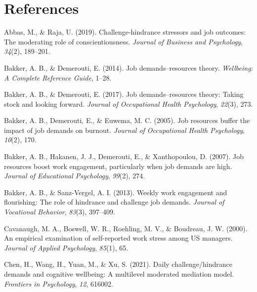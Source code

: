 \documentclass[
  man,mask]{apa7}
\newlength{\cslhangindent}
\newlength{\cslentryspacingunit} %
\newenvironment{CSLReferences}[2] %
 {%
  \setlength{\parindent}{0pt}
  \ifodd #1
  \let\oldpar\par
  \def\par{\hangindent=\cslhangindent\oldpar}
  \fi
  \setlength{\parskip}{#2\cslentryspacingunit}
 }%
 {}
\begin{document}
\hypertarget{references}{%
\section{References}\label{references}}

\begingroup
\setlength{\parindent}{-0.5in}
\setlength{\leftskip}{0.5in}

\hypertarget{refs}{}
\begin{CSLReferences}{1}{0}
\leavevmode{}%
Abbas, M., \& Raja, U. (2019). Challenge-hindrance stressors and job outcomes: The moderating role of conscientiousness. \emph{Journal of Business and Psychology}, \emph{34}(2), 189--201.

\leavevmode{}%
Bakker, A. B., \& Demerouti, E. (2014). Job demands--resources theory. \emph{Wellbeing: A Complete Reference Guide}, 1--28.

\leavevmode{}%
Bakker, A. B., \& Demerouti, E. (2017). Job demands--resources theory: Taking stock and looking forward. \emph{Journal of Occupational Health Psychology}, \emph{22}(3), 273.

\leavevmode{}%
Bakker, A. B., Demerouti, E., \& Euwema, M. C. (2005). Job resources buffer the impact of job demands on burnout. \emph{Journal of Occupational Health Psychology}, \emph{10}(2), 170.

\leavevmode{}%
Bakker, A. B., Hakanen, J. J., Demerouti, E., \& Xanthopoulou, D. (2007). Job resources boost work engagement, particularly when job demands are high. \emph{Journal of Educational Psychology}, \emph{99}(2), 274.

\leavevmode{}%
Bakker, A. B., \& Sanz-Vergel, A. I. (2013). Weekly work engagement and flourishing: The role of hindrance and challenge job demands. \emph{Journal of Vocational Behavior}, \emph{83}(3), 397--409.

\leavevmode{}%
Cavanaugh, M. A., Boswell, W. R., Roehling, M. V., \& Boudreau, J. W. (2000). An empirical examination of self-reported work stress among US managers. \emph{Journal of Applied Psychology}, \emph{85}(1), 65.

\leavevmode{}%
Chen, H., Wang, H., Yuan, M., \& Xu, S. (2021). Daily challenge/hindrance demands and cognitive wellbeing: A multilevel moderated mediation model. \emph{Frontiers in Psychology}, \emph{12}, 616002.


\end{CSLReferences}
\end{document}
